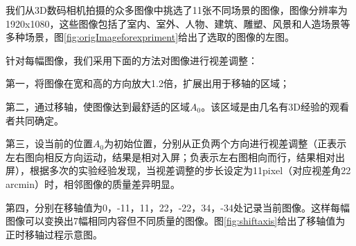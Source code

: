 我们从3D数码相机拍摄的众多图像中挑选了11张不同场景的图像，图像分辨率为1920x1080，这些图像包括了室内、室外、人物、建筑、雕塑、风景和人造场景等多种场景，图\ref{fig:origImageforexpriment}给出了选取的图像的左图。
\begin{figure}
  \centering
\end{figure}

针对每幅图像，我们采用下面的方法对图像进行视差调整：

第一，将图像在宽和高的方向放大1.2倍，扩展出用于移轴的区域；

第二，通过移轴，使图像达到最舒适的区域$A_0$。该区域是由几名有3D经验的观看者共同确定。

第三，设当前的位置$A_0$为初始位置，分别从正负两个方向进行视差调整（正表示左右图向相反方向运动，结果是相对入屏；负表示左右图相向而行，结果相对出屏），根据多次的实验经验发现，当视差调整的步长设定为11pixel（对应视差角22 arcmin）时，相邻图像的质量差异明显。

第四，分别在移轴值为0，-11，11，22，-22，34，-34处记录当前图像。这样每幅图像可以变换出7幅相同内容但不同质量的图像。图\ref{fig:shiftaxis}给出了移轴值为正时移轴过程示意图。

